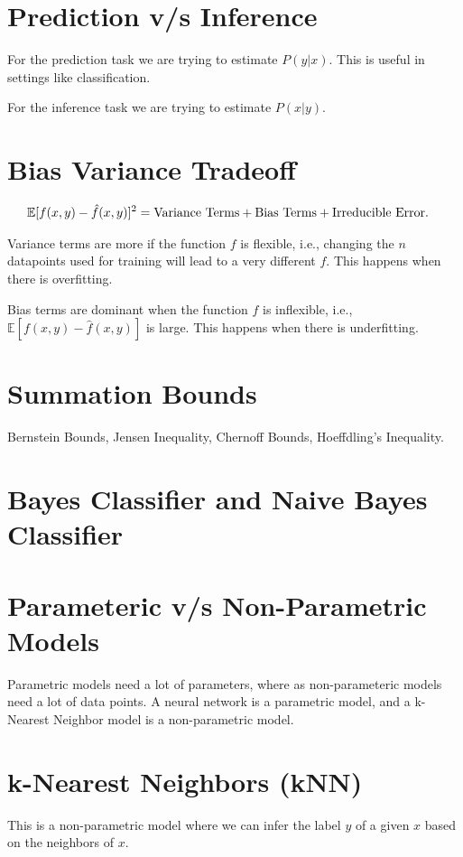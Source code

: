 \documentclass{article}
\begin{document}
\section{Prediction v/s Inference}
For the prediction task we are trying to estimate $P(y | x)$. This is useful in settings like classification.

For the inference task we are trying to estimate $P (x | y)$.

\section{Bias Variance Tradeoff}
\begin{equation}
\begin{split}
    \mathbb{E}[f(x, y) - \hat{f}(x, y)]^2 &= \rm{Variance\ Terms} + \rm{Bias\ Terms} + \rm{Irreducible\ Error}.
\end{split}
\end{equation}

Variance terms are more if the function $f$ is flexible, i.e., changing the $n$ datapoints used for training will lead to a very different $f$. This happens when there is overfitting.

Bias terms are dominant when the function $f$ is inflexible, i.e., $\mathbb{E}[f(x, y) - \hat{f}(x, y)]$ is large. This happens when there is underfitting.

\section{Summation Bounds}
Bernstein Bounds, Jensen Inequality, Chernoff Bounds, Hoeffdling's Inequality.

\section{Bayes Classifier and Naive Bayes Classifier}

\section{Parameteric v/s Non-Parametric Models}
Parametric models need a lot of parameters, where as non-parameteric models need a lot of data points. A neural network is a parametric model, and a k-Nearest Neighbor model is a non-parametric model.

\section{k-Nearest Neighbors (kNN)}
This is a non-parametric model where we can infer the label $y$ of a given $x$ based on the neighbors of $x$.
\end{document}
